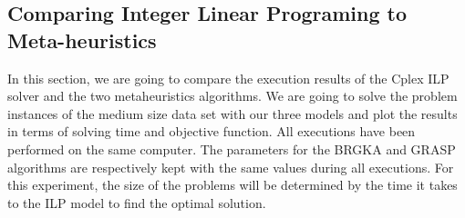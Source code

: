 \subsection{Comparing Integer Linear Programing to Meta-heuristics}

In this section, we are going to compare the execution results of the Cplex ILP solver and the two metaheuristics algorithms. We are going to solve the problem instances of the medium size data set with our three models and plot the results in terms of solving time and objective function. All executions have been performed on the same computer. The parameters for the BRGKA and GRASP algorithms are respectively kept with the same values during all executions. For this experiment, the size of the problems will be determined by the time it takes to the ILP model to find the optimal solution.\\


